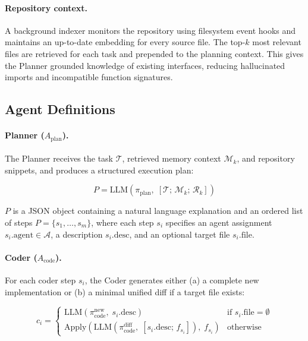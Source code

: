 \documentclass[journal]{IEEEtran}
\begin{document}
\paragraph{Repository context.}
A background indexer monitors the repository using filesystem event hooks and maintains an up-to-date embedding for every source file. The top-$k$ most relevant files are retrieved for each task and prepended to the planning context. This gives the Planner grounded knowledge of existing interfaces, reducing hallucinated imports and incompatible function signatures.

\subsection{Agent Definitions}
\label{sec:agents}

\paragraph{Planner ($A_\text{plan}$).}
The Planner receives the task $\mathcal{T}$, retrieved memory context $\mathcal{M}_k$, and repository snippets, and produces a structured execution plan:

\begin{equation}
  P = \text{LLM}(\pi_\text{plan},\;
      [\mathcal{T};\, \mathcal{M}_k;\, \mathcal{R}_k])
\end{equation}

\noindent $P$ is a JSON object containing a natural language explanation and an ordered list of steps $P = \{s_1, \dots, s_m\}$, where each step $s_i$ specifies an agent assignment $s_i.\text{agent} \in \mathcal{A}$, a description $s_i.\text{desc}$, and an optional target file $s_i.\text{file}$.

\paragraph{Coder ($A_\text{code}$).}
For each coder step $s_i$, the Coder generates either (a) a complete new implementation or (b) a minimal unified diff if a target file exists:

\begin{equation}
  c_i =
  \begin{cases}
    \text{LLM}(\pi_\text{code}^\text{new},\; s_i.\text{desc})
      & \text{if } s_i.\text{file} = \emptyset \\
    \text{Apply}(\text{LLM}(\pi_\text{code}^\text{diff},\;
      [s_i.\text{desc};\, f_{s_i}]),\; f_{s_i})
      & \text{otherwise}
  \end{cases}
\end{equation}
\end{document}
